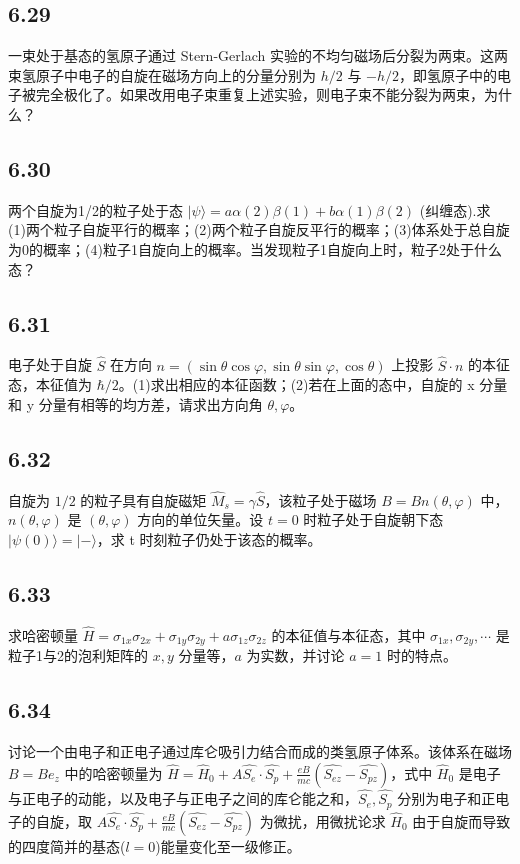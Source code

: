 \subsection{6.29}
一束处于基态的氢原子通过 Stern-Gerlach 实验的不均匀磁场后分裂为两束。这两束氢原子中电子的自旋在磁场方向上的分量分别为 $h/2$ 与 $-h/2$，即氢原子中的电子被完全极化了。如果改用电子束重复上述实验，则电子束不能分裂为两束，为什么？

\subsection{6.30}
两个自旋为1/2的粒子处于态 $|\psi\rangle = a\alpha(2)\beta(1)+b\alpha(1)\beta(2)$ (纠缠态).求 (1)两个粒子自旋平行的概率；(2)两个粒子自旋反平行的概率；(3)体系处于总自旋为0的概率；(4)粒子1自旋向上的概率。当发现粒子1自旋向上时，粒子2处于什么态？

\subsection{6.31}
电子处于自旋 $\hat{S}$ 在方向 $n=(\sin\theta\cos\varphi,\sin\theta\sin\varphi,\cos\theta)$ 上投影 $\hat{S}\cdot n$ 的本征态，本征值为 $\hbar/2$。(1)求出相应的本征函数；(2)若在上面的态中，自旋的 x 分量和 y 分量有相等的均方差，请求出方向角 $\theta,\varphi$。

\subsection{6.32}
自旋为 $1/2$ 的粒子具有自旋磁矩 $\hat{M}_s = \gamma \hat{S}$，该粒子处于磁场 $B = Bn(\theta, \varphi)$ 中，$n(\theta, \varphi)$ 是 $(\theta, \varphi)$ 方向的单位矢量。设 $t = 0$ 时粒子处于自旋朝下态 $|\psi(0)\rangle = |-\rangle$，求 t 时刻粒子仍处于该态的概率。

\subsection{6.33}
求哈密顿量 $\hat{H} = \sigma_{1x} \sigma_{2x} + \sigma_{1y} \sigma_{2y} + a \sigma_{1z} \sigma_{2z}$ 的本征值与本征态，其中 $\sigma_{1x}, \sigma_{2y}, \cdots$ 是粒子1与2的泡利矩阵的 $x, y$ 分量等，$a$ 为实数，并讨论 $a=1$ 时的特点。

\subsection{6.34}
讨论一个由电子和正电子通过库仑吸引力结合而成的类氢原子体系。该体系在磁场 $B = Be_z$ 中的哈密顿量为 $\hat{H} = \hat{H}_0 + A\hat{S_e} \cdot \hat{S_p} + \frac{eB}{mc} (\hat{S_{ez}} - \hat{S_{pz}})$，式中 $\hat{H}_0$ 是电子与正电子的动能，以及电子与正电子之间的库仑能之和，$\hat{S_e}, \hat{S_p}$ 分别为电子和正电子的自旋，取 $A\hat{S_e} \cdot \hat{S_p} + \frac{eB}{mc} (\hat{S_{ez}} - \hat{S_{pz}})$ 为微扰，用微扰论求 $\hat{H}_0$ 由于自旋而导致的四度简并的基态($l=0$)能量变化至一级修正。

